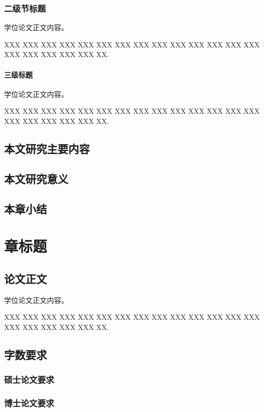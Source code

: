 \documentclass[mode = thesis, fontset = lxgw]{westlakethesis}
\begin{document}
\subsection{二级节标题}

学位论文正文内容。

XXX XXX XXX XXX XXX XXX XXX XXX XXX XXX XXX XXX XXX XXX XXX
XXX XXX XXX XXX XX.

\subsubsection{三级标题}

学位论文正文内容。

XXX XXX XXX XXX XXX XXX XXX XXX XXX XXX XXX XXX XXX XXX XXX
XXX XXX XXX XXX XX.

\section{本文研究主要内容}

\section{本文研究意义}

\section{本章小结}

\chapter{章标题}

\section{论文正文}

学位论文正文内容。

XXX XXX XXX XXX XXX XXX XXX XXX XXX XXX XXX XXX XXX XXX XXX
XXX XXX XXX XXX XX.

\section{字数要求}

\subsection{硕士论文要求}

\subsection{博士论文要求}
\end{document}
